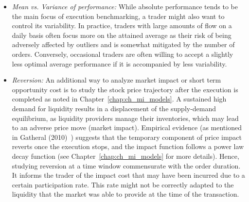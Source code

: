 \begin{itemize}
\item \emph{Mean vs. Variance of performance:} While absolute performance tends to be the main focus of execution benchmarking, a trader might also want to control its variability. In practice, traders with large amounts of flow on a daily basis often focus more on the attained average as their risk of being adversely affected by outliers and is somewhat mitigated by the number of orders. Conversely, occasional traders are often willing to accept a slightly less optimal average performance if it is accompanied by less variability.

\item \emph{Reversion:} An additional way to analyze market impact or short term opportunity cost is to study the stock price trajectory after the execution is completed as noted in Chapter~\ref{chap:ch_mi_models}. A sustained high demand for liquidity results in a displacement of the supply-demand equilibrium, as liquidity providers manage their inventories, which may lead to an adverse price move (market impact). Empirical evidence (as mentioned in Gatheral (2010)~\cite{gatheral}) suggests that the temporary component of price impact reverts once the execution stops, and the impact function follows a power law decay function (see Chapter~\ref{chap:ch_mi_models} for more details). Hence, studying reversion at a time window commensurate with the order duration. It informs the trader of the impact cost that may have been incurred due to a certain participation rate. This rate might not be correctly adapted to the liquidity that the market was able to provide at the time of the transaction.



\end{itemize}
